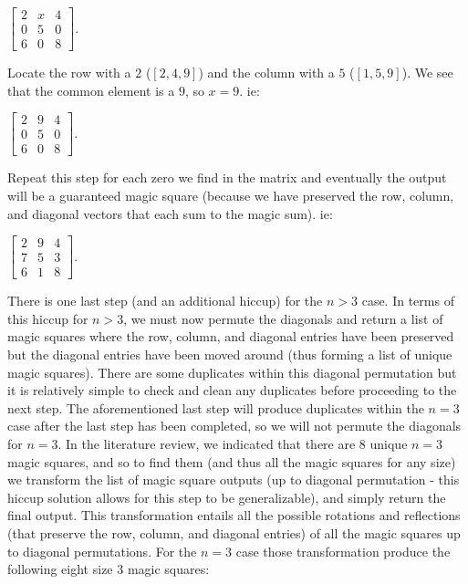 \documentclass{article}
\begin{document}
    \begin{center}
        $\begin{bmatrix}
            2 & x & 4 \\
            0 & 5 & 0 \\
            6 & 0 & 8
        \end{bmatrix}$.
    \end{center}
    Locate the row with a $2$ ($[2, 4, 9]$) and the column with a $5$ ($[1, 5, 9]$). We see that the common element is a $9$, so $x = 9$. ie:
    \begin{center}
        $\begin{bmatrix}
            2 & 9 & 4 \\
            0 & 5 & 0 \\
            6 & 0 & 8
        \end{bmatrix}$.
    \end{center}
    Repeat this step for each zero we find in the matrix and eventually the output will be a guaranteed magic square (because we have preserved the row, column, and diagonal vectors that each sum to the magic sum). ie:
    \begin{center}
        $\begin{bmatrix}
            2 & 9 & 4 \\
            7 & 5 & 3 \\
            6 & 1 & 8
        \end{bmatrix}$.
    \end{center}
    There is one last step (and an additional hiccup) for the $n > 3$ case. In terms of this hiccup for $n > 3$, we must now permute the diagonals and return a list of magic squares where the row, column, and diagonal entries have been preserved but the diagonal entries have been moved around (thus forming a list of unique magic squares). There are some duplicates within this diagonal permutation but it is relatively simple to check and clean any duplicates before proceeding to the next step. The aforementioned last step will produce duplicates within the $n = 3$ case after the last step has been completed, so we will not permute the diagonals for $n = 3$. In the literature review, we indicated that there are 8 unique $n = 3$ magic squares, and so to find them (and thus all the magic squares for any size) we transform the list of magic square outputs (up to diagonal permutation - this hiccup solution allows for this step to be generalizable), and simply return the final output. This transformation entails all the possible rotations and reflections (that preserve the row, column, and diagonal entries) of all the magic squares up to diagonal permutations. For the $n = 3$ case those transformation produce the following eight size $3$ magic squares: 
\end{document}
